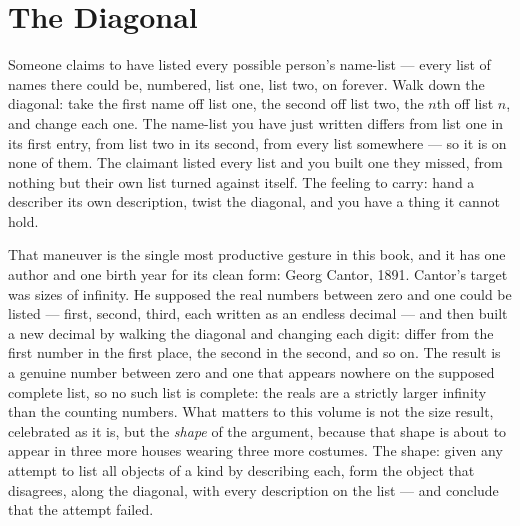 \chapter{The Diagonal}

\begin{intuition}
Someone claims to have listed every possible person's name-list --- every
list of names there could be, numbered, list one, list two, on forever.
Walk down the diagonal: take the first name off list one, the second off
list two, the $n$th off list $n$, and change each one. The name-list you
have just written differs from list one in its first entry, from list two
in its second, from every list somewhere --- so it is on none of them.
The claimant listed every list and you built one they missed, from
nothing but their own list turned against itself. The feeling to carry:
hand a describer its own description, twist the diagonal, and you have a
thing it cannot hold.
\end{intuition}

That maneuver is the single most productive gesture in this book, and it
has one author and one birth year for its clean form: Georg Cantor, 1891.
Cantor's target was sizes of infinity. He supposed the real numbers
between zero and one could be listed --- first, second, third, each
written as an endless decimal --- and then built a new decimal by walking
the diagonal and changing each digit: differ from the first number in the
first place, the second in the second, and so on. The result is a genuine
number between zero and one that appears nowhere on the supposed complete
list, so no such list is complete: the reals are a strictly larger
infinity than the counting numbers. What matters to this volume is not
the size result, celebrated as it is, but the \emph{shape} of the
argument, because that shape is about to appear in three more houses
wearing three more costumes. The shape: given any attempt to list all
objects of a kind by describing each, form the object that disagrees,
along the diagonal, with every description on the list --- and conclude
that the attempt failed.

